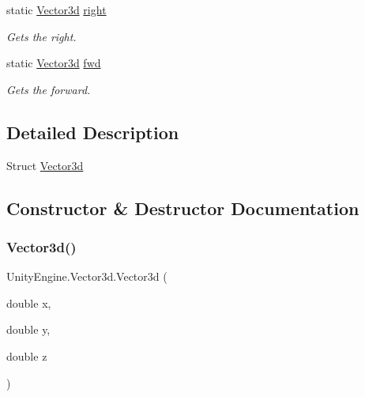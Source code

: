 \begin{DoxyCompactItemize}
static \hyperlink{struct_unity_engine_1_1_vector3d}{Vector3d} \hyperlink{struct_unity_engine_1_1_vector3d_af9eef3de2cdf5153f8aafdf805c9775a}{right}
\begin{DoxyCompactList}\small\item\em Gets the right. \end{DoxyCompactList}\item 
static \hyperlink{struct_unity_engine_1_1_vector3d}{Vector3d} \hyperlink{struct_unity_engine_1_1_vector3d_a04acb0f65939bdd654ef5c70e024a1ac}{fwd}
\begin{DoxyCompactList}\small\item\em Gets the forward. \end{DoxyCompactList}\end{DoxyCompactItemize}


\subsection{Detailed Description}
Struct \hyperlink{struct_unity_engine_1_1_vector3d}{Vector3d} 



\subsection{Constructor \& Destructor Documentation}
\mbox{\label{struct_unity_engine_1_1_vector3d_a3743526f0fe72482014117b62ed45c90}} 
\subsubsection{\texorpdfstring{Vector3d()}{Vector3d()}\hspace{0.1cm}{\footnotesize\ttfamily [1/4]}}
{\footnotesize\ttfamily Unity\+Engine.\+Vector3d.\+Vector3d (\begin{DoxyParamCaption}\item[{double}]{x,  }\item[{double}]{y,  }\item[{double}]{z }\end{DoxyParamCaption})\hspace{0.3cm}{\ttfamily [inline]}}



